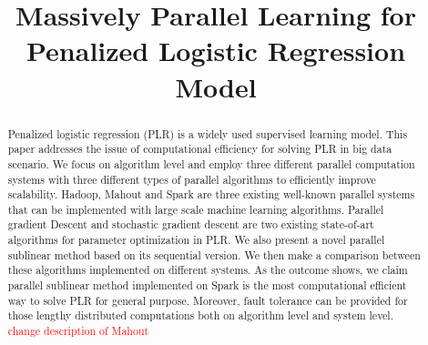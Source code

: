 \documentclass{llncs}
\newcommand{\comment}{\textcolor{red}}
\begin{document}
\mainmatter  %

\title{Massively Parallel Learning for Penalized Logistic Regression Model}


%
%

%
\maketitle

\begin{abstract}
Penalized logistic regression (PLR) is a widely used supervised learning model.
This paper addresses the issue of computational efficiency for solving PLR in big data scenario.
We focus on algorithm level and employ three different parallel computation systems with three different types of parallel algorithms to efficiently improve scalability.
Hadoop, Mahout and Spark are three existing well-known parallel systems that can be implemented with large scale machine learning algorithms.
Parallel gradient Descent and stochastic gradient descent are two existing state-of-art algorithms for parameter optimization in PLR.
We also present a novel parallel sublinear method based on its sequential version.
We then make a comparison between these algorithms implemented on different systems.
As the outcome shows, we claim parallel sublinear method implemented on Spark is the most computational efficient way to solve PLR for general purpose.
Moreover, fault tolerance can be provided for those lengthy distributed computations both on algorithm level and system level.
\comment{change description of Mahout}
\end{abstract}
\end{document}

